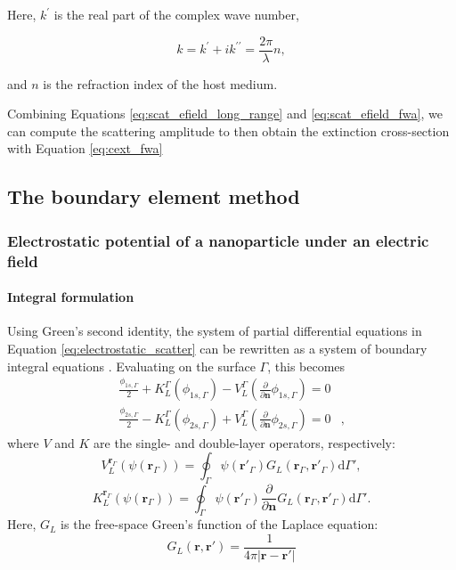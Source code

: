 \noindent Here, $k^\prime$ is the real part of the complex wave number, 

\begin{equation}
    k = k^\prime + ik^{\prime\prime} = \frac{2\pi}{\lambda} n,
\end{equation}

\noindent and $n$ is the refraction index of the host medium.

Combining Equations \eqref{eq:scat_efield_long_range} and \eqref{eq:scat_efield_fwa},
we can compute the scattering amplitude to then obtain the extinction cross-section 
with Equation \eqref{eq:cext_fwa}


\subsection{The boundary element method} \label{sec:lspr_bem}

\subsubsection{Electrostatic potential of a nanoparticle under an electric field} \label{sec:pot_elec_field}

\paragraph{Integral formulation}

Using Green's second identity, the system of partial differential equations 
in Equation \eqref{eq:electrostatic_scatter} can be rewritten as a system 
of boundary integral equations \cite{BrebbiaDominguez1992}. Evaluating on the surface $\Gamma$, this
becomes
%
\begin{align} \label{eq:integral_eq_lspr_nobc}
\frac{\phi_{1s,\Gamma}}{2}+ K_{L}^{\Gamma}(\phi_{1s,\Gamma}) - V_{L}^{\Gamma} \left(\frac{\partial}{\partial \mathbf{n}}\phi_{1s,\Gamma} \right) = 0&  \nonumber \\
\frac{\phi_{2s,\Gamma}}{2} - K_{L}^{\Gamma}(\phi_{2s,\Gamma}) + V_{L}^{\Gamma} \left( \frac{\partial}{\partial \mathbf{n}} \phi_{2s,\Gamma} \right) = 0&,
\end{align}
%
where $V$ and $K$ are the single- and double-layer operators, respectively:
%
\begin{equation}\label{eq:single_layer}
V^{\mathbf{r}_\Gamma}_L (\psi(\mathbf{r}_\Gamma)) = \oint_\Gamma \psi(\mathbf{r}'_\Gamma) G_L(\mathbf{r}_\Gamma, \mathbf{r}'_\Gamma) \text{d} \Gamma',
\end{equation}
%
\begin{equation}\label{eq:double_layer}
K^{\mathbf{r}_\Gamma}_L (\psi(\mathbf{r}_\Gamma)) = \oint_\Gamma \psi(\mathbf{r}'_\Gamma) \frac{\partial}{\partial \mathbf{n}}G_L(\mathbf{r}_\Gamma, \mathbf{r}'_\Gamma) \text{d} \Gamma'.
\end{equation}
%
\noindent Here, $G_L$ is the free-space Green's function of the Laplace equation:
%
\begin{equation}
G_L(\mathbf{r},\mathbf{r}') = \frac{1}{4\pi|\mathbf{r}-\mathbf{r}'|}
\end{equation}

